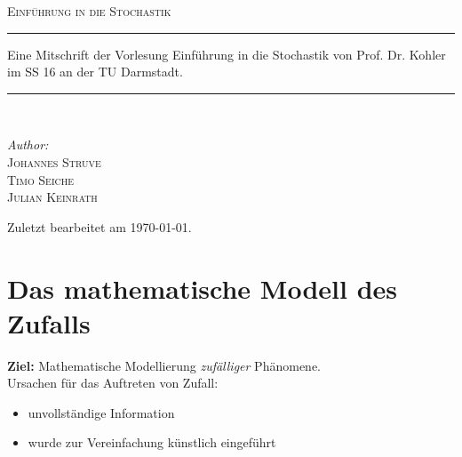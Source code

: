 \documentclass[a4paper,12pt,fleqn]{scrartcl}
\theoremstyle{definition}
\theoremstyle{plain}
\theoremstyle{remark}
\begin{document}
\begin{titlepage}
\begin{center}
\textsc{\LARGE Einführung in die Stochastik}\\[2.0cm]
\rule{\linewidth}{0.5mm}
Eine Mitschrift der Vorlesung Einführung in die Stochastik von Prof. Dr. Kohler im SS 16 an der TU Darmstadt.
\rule{\linewidth}{0.5mm}\\[2.0cm]
\begin{minipage}{0.4\textwidth}
\begin{flushleft}
\large \emph{Author:}\\\textsc{Johannes Struve\\Timo Seiche\\Julian Keinrath}\\[1.0cm]
\end{flushleft}
\end{minipage}
\vfill
Zuletzt bearbeitet am {\large \today}.
\end{center}
\end{titlepage}

\tableofcontents

\newpage

\section{Das mathematische Modell des Zufalls}
\textbf{Ziel:} Mathematische Modellierung \emph{zufälliger} Phänomene.\\
Ursachen für das Auftreten von Zufall:
\begin{itemize}
\item unvollständige Information
\item wurde zur Vereinfachung künstlich eingeführt
\end{itemize}
\end{document}
